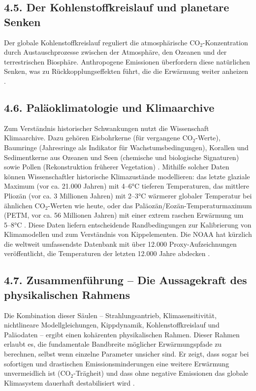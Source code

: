 \documentclass[12pt, a4paper]{article}
\begin{document}
	\subsection*{4.5. Der Kohlenstoffkreislauf und planetare Senken}
	Der globale Kohlenstoffkreislauf reguliert die atmosphärische CO$_2$-Konzentration durch Austauschprozesse zwischen der Atmosphäre, den Ozeanen und der terrestrischen Biosphäre. Anthropogene Emissionen überfordern diese natürlichen Senken, was zu Rückkopplungseffekten führt, die die Erwärmung weiter anheizen \cite{asaadi2024}.
	
	\subsection*{4.6. Paläoklimatologie und Klimaarchive}
	Zum Verständnis historischer Schwankungen nutzt die Wissenschaft Klimaarchive. Dazu gehören Eisbohrkerne (für vergangene CO$_2$-Werte), Baumringe (Jahresringe als Indikator für Wachstumsbedingungen), Korallen und Sedimentkerne aus Ozeanen und Seen (chemische und biologische Signaturen) sowie Pollen (Rekonstruktion früherer Vegetation) \cite{noaa2020, noaapaleo2025}.
	Mithilfe solcher Daten können Wissenschaftler historische Klimazustände modellieren: das letzte glaziale Maximum (vor ca. 21.000 Jahren) mit 4–6°C tieferen Temperaturen, das mittlere Pliozän (vor ca. 3 Millionen Jahren) mit 2–3°C wärmerer globaler Temperatur bei ähnlichen CO$_2$-Werten wie heute, oder das Paläozän/Eozän-Temperaturmaximum (PETM, vor ca. 56 Millionen Jahren) mit einer extrem raschen Erwärmung um 5–8°C \cite{noaa2020}.
	Diese Daten liefern entscheidende Randbedingungen zur Kalibrierung von Klimamodellen und zum Verständnis von Kippelementen.
	Die NOAA hat kürzlich die weltweit umfassendste Datenbank mit über 12.000 Proxy-Aufzeichnungen veröffentlicht, die Temperaturen der letzten 12.000 Jahre abdecken \cite{noaa2020}.
	
	\subsection*{4.7. Zusammenführung – Die Aussagekraft des physikalischen Rahmens}
	Die Kombination dieser Säulen – Strahlungsantrieb, Klimasensitivität, nichtlineare Modellgleichungen, Kippdynamik, Kohlenstoffkreislauf und Paläodaten – ergibt einen kohärenten physikalischen Rahmen.
	Dieser Rahmen erlaubt es, die fundamentale Bandbreite möglicher Erwärmungspfade zu berechnen, selbst wenn einzelne Parameter unsicher sind.
	Er zeigt, dass sogar bei sofortigen und drastischen Emissionsminderungen eine weitere Erwärmung unvermeidlich ist (CO$_2$-Trägheit) und dass ohne negative Emissionen das globale Klimasystem dauerhaft destabilisiert wird \cite{ipcc2021}.
	
\end{document}
